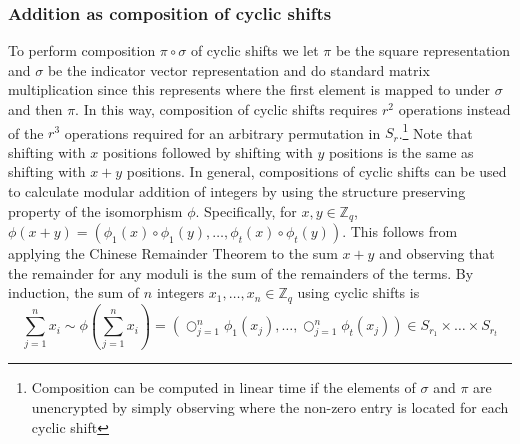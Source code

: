 \subsubsection*{Addition as composition of cyclic shifts}\label{sec:composition_addition}
To perform composition $\pi \circ \sigma$ of cyclic shifts we let $\pi$ be the square representation and $\sigma$ be the indicator vector representation and do standard matrix multiplication since this represents where the first element is mapped to under $\sigma$ and then $\pi$. In this way, composition of cyclic shifts requires $r^2$ operations instead of the $r^3$ operations required for an arbitrary permutation in $S_r$.\footnote{Composition can be computed in linear time if the elements of $\sigma$ and $\pi$ are unencrypted by simply observing where the non-zero entry is located for each cyclic shift} Note that shifting with $x$ positions followed by shifting with $y$ positions is the same as shifting with $x+y$ positions. In general, compositions of cyclic shifts can be used to calculate modular addition of integers by using the structure preserving property of the isomorphism $\phi$. Specifically, for $x,y \in \mathbb{Z}_q$, $\phi(x + y) = (\phi_1(x) \circ \phi_1(y), \dots, \phi_t(x) \circ \phi_t(y))$. This follows from applying the Chinese Remainder Theorem to the sum $x+y$ and observing that the remainder for any moduli is the sum of the remainders of the terms. By induction, the sum of $n$ integers $x_1, \dots, x_n \in \mathbb{Z}_q$ using cyclic shifts is
\begin{equation}\label{cyclic-sum}
    \sum_{j=1}^{n} x_i \sim \phi(\sum_{j=1}^{n} x_i) = (\bigcirc_{j=1}^n \phi_1(x_j), \dots, \bigcirc_{j=1}^n \phi_t(x_j)) \in S_{r_1} \times \dots \times S_{r_t}
\end{equation}

